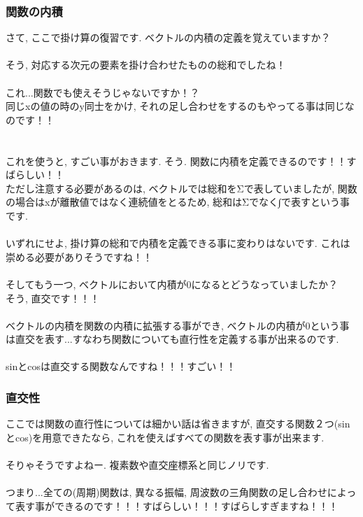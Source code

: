 \documentclass[11pt,a4paper]{jsarticle}
\begin{document}
\subsubsection{関数の内積}
さて, ここで掛け算の復習です. ベクトルの内積の定義を覚えていますか？\\
\\
そう, 対応する次元の要素を掛け合わせたものの総和でしたね！\\
\\
これ...関数でも使えそうじゃないですか！？\\
同じxの値の時のy同士をかけ, それの足し合わせをするのもやってる事は同じなのです！！\\
\\
\\
これを使うと, すごい事がおきます. そう. 関数に内積を定義できるのです！！すばらしい！！\\
ただし注意する必要があるのは, ベクトルでは総和をΣで表していましたが, 関数の場合はxが離散値ではなく連続値をとるため, 総和はΣでなく∫で表すという事です.\\
\\
いずれにせよ, 掛け算の総和で内積を定義できる事に変わりはないです. これは崇める必要がありそうですね！！\\
\\
そしてもう一つ, ベクトルにおいて内積が0になるとどうなっていましたか？\\
そう, 直交です！！！\\
\\
ベクトルの内積を関数の内積に拡張する事ができ, ベクトルの内積が0という事は直交を表す...すなわち関数についても直行性を定義する事が出来るのです.\\
\\
sinとcosは直交する関数なんですね！！！すごい！！
\subsubsection{直交性}
ここでは関数の直行性については細かい話は省きますが, 直交する関数２つ(sinとcos)を用意できたなら, これを使えばすべての関数を表す事が出来ます.\\
\\
そりゃそうですよねー. 複素数や直交座標系と同じノリです.\\
\\
つまり...全ての(周期)関数は, 異なる振幅, 周波数の三角関数の足し合わせによって表す事ができるのです！！！すばらしい！！！すばらしすぎますね！！！\\
\\
\end{document}
